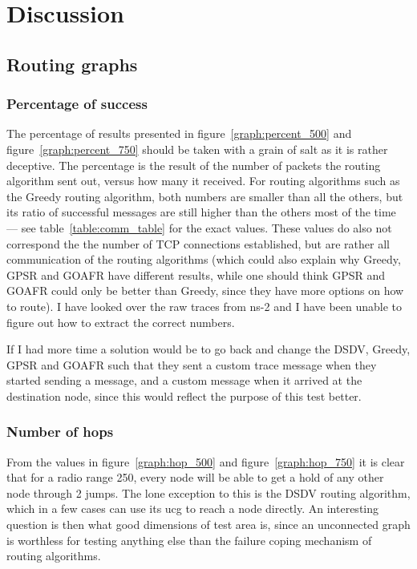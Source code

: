 \section{Discussion}
\label{section:discussion}

\subsection{Routing graphs}

\subsubsection{Percentage of success}
\label{section:percent_success_routing}
The percentage of results presented in figure~\ref{graph:percent_500} and figure~\ref{graph:percent_750} should be taken with a grain of salt as it is rather deceptive. The percentage is the result of the number of packets the routing algorithm sent out, versus how many it received. For routing algorithms such as the Greedy routing algorithm, both numbers are smaller than all the others, but its ratio of successful messages are still higher than the others most of the time --- see table~\ref{table:comm_table} for the exact values. These values do also not correspond the the number of TCP connections established, but are rather all communication of the routing algorithms (which could also explain why Greedy, GPSR and GOAFR have different results, while one should think GPSR and GOAFR could only be better than Greedy, since they have more options on how to route). I have looked over the raw traces from ns-2 and I have been unable to figure out how to extract the correct numbers. 


If I had more time a solution would be to go back and change the DSDV, Greedy, GPSR and GOAFR such that they sent a custom trace message when they started sending a message, and a custom message when it arrived at the destination node, since this would reflect the purpose of this test better.

\subsubsection{Number of hops}
From the values in figure~\ref{graph:hop_500} and figure~\ref{graph:hop_750} it is clear that for a radio range 250, every node will be able to get a hold of any other node through 2 jumps.
The lone exception to this is the DSDV routing algorithm, which in a few cases can use its \ac{ucg} to reach a node directly. An interesting question is then what good dimensions of test area is, since an unconnected graph is worthless for testing anything else than the failure coping mechanism of routing algorithms. 

